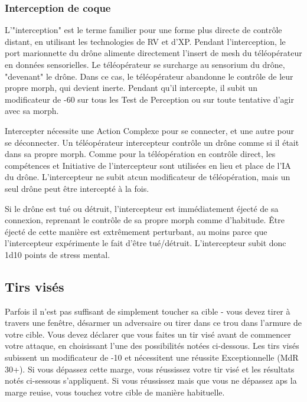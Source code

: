\subsubsection{Interception de  coque} 

L'"interception" est le terme familier pour une forme plus directe de contrôle distant, en utilisant les technologies de RV et d'XP. Pendant l'interception, le port marionnette du drône alimente directement l'insert de mesh du téléopérateur en données sensorielles. Le téléopérateur se surcharge au sensorium du drône, "devenant" le drône. Dans ce cas, le téléopérateur abandonne le contrôle de leur propre morph, qui devient inerte. Pendant qu'il intercepte, il subit un modificateur de -60 sur tous les Test de Perception ou sur toute tentative d'agir avec sa morph. 

Intercepter nécessite une Action Complexe pour se connecter, et une autre pour se déconnecter. Un téléopérateur intercepteur contrôle un drône comme si il était dans sa propre morph. Comme pour la téléopération en contrôle direct, les compétences et Initiative de l'intercepteur sont utilisées en lieu et place de l'IA du drône. L'intercepteur ne subit atcun modificateur de téléopération, mais un seul drône peut être intercepté à la fois. 

Si le drône est tué ou détruit, l'intercepteur est immédiatement éjecté de sa connexion, reprenant le contrôle de sa propre morph comme d'habitude. Être éjecté de cette manière est extrêmement perturbant, au moins parce que l'intercepteur expérimente le fait d'être tué/détruit. L'intercepteur subit donc 1d10 points de stress mental. 



\subsection{Tirs visés} \label{sec:called-shots} 

Parfois il n'est pas suffisant de simplement toucher sa cible - vous devez tirer à travers une fenêtre, désarmer un adversaire ou tirer dans ce trou dans l'armure de votre cible. Vous devez déclarer que vous faites un tir visé avant de commencer votre attaque, en choisissant l'une des possibilités notées ci-dessous. Les tirs visés subissent un modificateur de -10 et nécessitent une réussite Exceptionnelle (MdR 30+). Si vous dépassez cette marge, vous réussissez votre tir visé et les résultats notés ci-sessous s'appliquent. Si vous réussissez mais que vous ne dépassez aps la marge reuise, vous touchez votre cible de manière habituelle. 

